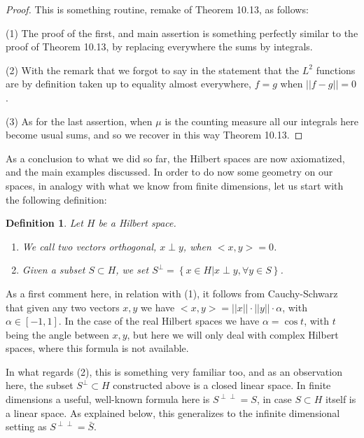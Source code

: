 \documentclass[12pt]{amsbook}
\newtheorem{definition}[theorem]{Definition}
\begin{document}
\begin{proof}
This is something routine, remake of Theorem 10.13, as follows:

\medskip

(1) The proof of the first, and main assertion is something perfectly similar to the proof of Theorem 10.13, by replacing everywhere the sums by integrals. 

\medskip

(2) With the remark that we forgot to say in the statement that the $L^2$ functions are by definition taken up to equality almost everywhere, $f=g$ when $||f-g||=0$.

\medskip

(3) As for the last assertion, when $\mu$ is the counting measure all our integrals here become usual sums, and so we recover in this way Theorem 10.13.
\end{proof}

As a conclusion to what we did so far, the Hilbert spaces are now axiomatized, and the main examples discussed. In order to do now some geometry on our spaces, in analogy with what we know from finite dimensions, let us start with the following definition:

\begin{definition}
Let $H$ be a Hilbert space.
\begin{enumerate}
\item We call two vectors orthogonal, $x\perp y$, when $<x,y>=0$.

\item Given a subset $S\subset H$, we set $S^\perp=\left\{x\in H\big|x\perp y,\forall y\in S\right\}$.
\end{enumerate}
\end{definition}

As a first comment here, in relation with (1), it follows from Cauchy-Schwarz that given any two vectors $x,y$ we have $<x,y>=||x||\cdot||y||\cdot\alpha$, with $\alpha\in[-1,1]$. In the case of the real Hilbert spaces we have $\alpha=\cos t$, with $t$ being the angle between $x,y$, but here we will only deal with complex Hilbert spaces, where this formula is not available.

\bigskip

In what regards (2), this is something very familiar too, and as an observation here, the subset $S^\perp\subset H$ constructed above is a closed linear space. In finite dimensions a useful, well-known formula here is $S^{\perp\perp}=S$, in case $S\subset H$ itself is a linear space. As explained below, this generalizes to the infinite dimensional setting as $S^{\perp\perp}=\bar{S}$.
\end{document}

